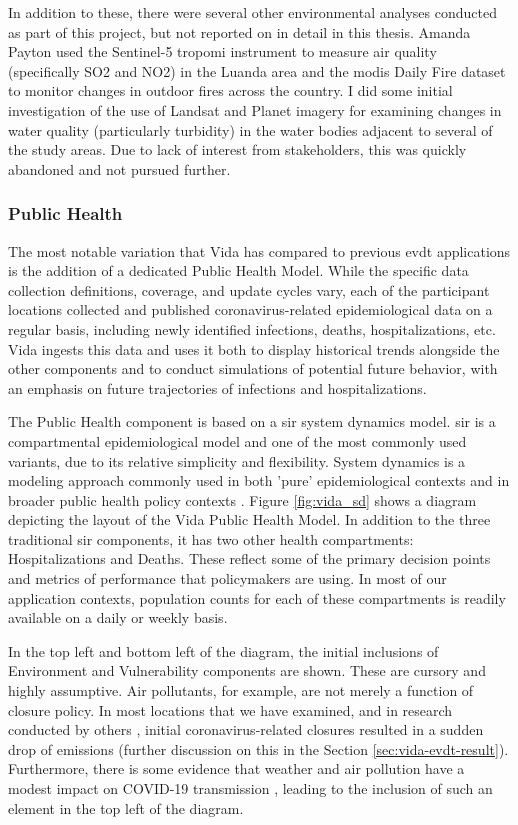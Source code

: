 In addition to these, there were several other environmental analyses conducted as part of this project, but not reported on in detail in this thesis. Amanda Payton used the Sentinel-5 \ac{tropomi} instrument to measure air quality (specifically SO2 and NO2) in the Luanda area and the \ac{modis} Daily Fire dataset to monitor changes in outdoor fires across the country. I did some initial investigation of the use of Landsat and Planet imagery for examining changes in water quality (particularly turbidity) in the water bodies adjacent to several of the study areas. Due to lack of interest from stakeholders, this was quickly abandoned and not pursued further.

\subsubsection{Public Health} \label{sec:vida-evdt-method-p}

The most notable variation that Vida has compared to previous \ac{evdt} applications is the addition of a dedicated Public Health Model. While the specific data collection definitions, coverage, and update cycles vary, each of the participant locations collected and published coronavirus-related epidemiological data on a regular basis, including newly identified infections, deaths, hospitalizations, etc. Vida ingests this data and uses it both to display historical trends alongside the other components and to conduct simulations of potential future behavior, with an emphasis on future trajectories of infections and hospitalizations. 

The Public Health component is based on a \ac{sir} system dynamics model. \ac{sir} is a compartmental epidemiological model and one of the most commonly used variants, due to its relative simplicity and flexibility. System dynamics is a modeling approach commonly used in both 'pure' epidemiological contexts \cite{homerSystemDynamicsModeling2006} and in broader public health policy contexts \cite{deutschCommunitybasedSystemDynamics2020}. Figure \ref{fig:vida_sd} shows a diagram depicting the layout of the Vida Public Health Model. In addition to the three traditional \ac{sir} components, it has two other health compartments: Hospitalizations and Deaths. These reflect some of the primary decision points and metrics of performance that policymakers are using. In most of our application contexts, population counts for each of these compartments is readily available on a daily or weekly basis. 

In the top left and bottom left of the diagram, the initial inclusions of Environment and Vulnerability components are shown. These are cursory and highly assumptive. Air pollutants, for example, are not merely a function of closure policy. In most locations that we have examined, and in research conducted by others \cite{isaifanDramaticImpactCoronavirus2020}, initial coronavirus-related closures resulted in a sudden drop of emissions (further discussion on this in the Section \ref{sec:vida-evdt-result}). Furthermore, there is some evidence that weather and air pollution have a modest impact on COVID-19 transmission \cite{xuModestImpactWeather2020}, leading to the inclusion of such an element in the top left of the diagram.

